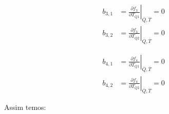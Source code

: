\begin{equation*}
	\begin{aligned}
		b_{3,1} &= \left. \frac{\partial f_3}{\partial T_{Q1}} \right|_{\overline{Q},\overline{T}} = 
				  0
				  \\
		b_{3,2} &= \left. \frac{\partial f_3}{\partial T_{Q2}} \right|_{\overline{Q},\overline{T}} = 
				  0
	\end{aligned}
\end{equation*}

\begin{equation*}
	\begin{aligned}
		b_{4,1} &= \left. \frac{\partial f_4}{\partial T_{Q1}} \right|_{\overline{Q},\overline{T}} = 
				  0
				  \\
		b_{4,2} &= \left. \frac{\partial f_4}{\partial T_{Q2}} \right|_{\overline{Q},\overline{T}} = 
				  0
	\end{aligned}
\end{equation*}

\noindent
Assim temos:

